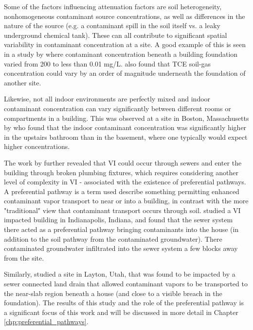 Some of the factors influencing attenuation factors are soil heterogeneity, nonhomogeneous contaminant source concentrations, as well as differences in the nature of the source (e.g. a contaminant spill in the soil itself vs. a leaky underground chemical tank).
These can all contribute to significant spatial variability in contaminant concentration at a site.
A good example of this is seen in a study by \citeauthor{luo_spatial_2009}\cite{luo_spatial_2009} where contaminant concentration beneath a building foundation varied from 200 to less than 0.01 mg/L.
\citeauthor{bekele_influence_2014}\cite{bekele_influence_2014} also found that TCE soil-gas concentration could vary by an order of magnitude underneath the foundation of another site.\par

Likewise, not all indoor environments are perfectly mixed and indoor contaminant concentration can vary significantly between different rooms or compartments in a building.
This was observed at a site in Boston, Massachusetts by \citeauthor{pennell_sewer_2013}\cite{pennell_sewer_2013} who found that the indoor contaminant concentration was significantly higher in the upstairs bathroom than in the basement, where one typically would expect higher concentrations.\par

The work by \citeauthor{pennell_sewer_2013}\cite{pennell_sewer_2013} further revealed that VI could occur through sewers and enter the building through broken plumbing fixtures, which requires considering another level of complexity in VI - associated with the existence of preferential pathways.
A preferential pathway is a term used describe something permitting enhanced contaminant vapor transport to near or into a building, in contrast with the more "traditional" view that contaminant transport occurs through soil.
\citeauthor{mchugh_evidence_2017}\cite{mchugh_evidence_2017} studied a VI impacted building in Indianapolis, Indiana, and found that the sewer system there acted as a preferential pathway bringing contaminants into the house (in addition to the soil pathway from the contaminated groundwater).
There contaminated groundwater infiltrated into the sewer system a few blocks away from the site.\par

Similarly, \citeauthor{guo_identification_2015}\cite{guo_identification_2015} studied a site in Layton, Utah, that was found to be impacted by a sewer connected land drain that allowed contaminant vapors to be transported to the near-slab region beneath a house (and close to a visible breach in the foundation).
The results of this study and the role of the preferential pathway is a significant focus of this work and will be discussed in more detail in Chapter \ref{chp:preferential_pathways}.\par

